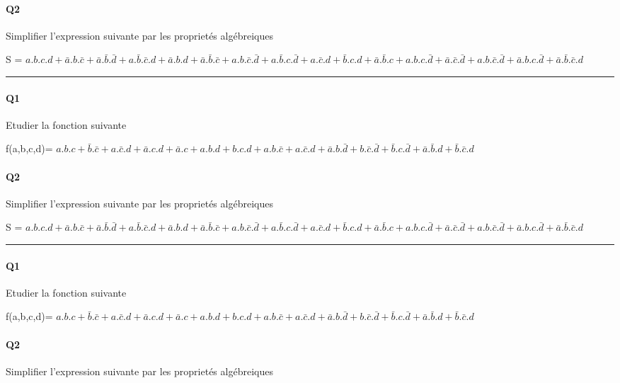 \paragraph{Q2}

Simplifier l'expression suivante par les proprietés algébreiques 

S = $a.b.c.d+\bar a.b.\bar c+\bar a.\bar b.\bar d+a.\bar b.\bar c.d + \bar a.b.d+\bar a.\bar b.\bar c+a.b.\bar c.\bar d+a.\bar b.c.\bar d + a.\bar c.d+\bar b.c.d+\bar a.\bar b.c+a.b.c.\bar d+\bar a.\bar c.\bar d + a.b.\bar c.\bar d+\bar a.b.c.\bar d+\bar a.\bar b.\bar c.d$

\hrule width 1\linewidth
\paragraph{Q1}

Etudier la fonction suivante

f(a,b,c,d)= $a.b.c+\bar b.\bar c+a.\bar c.d+\bar a.c.d + \bar a.c+a.b.d+b.c.d+a.b.\bar c+a.\bar c.d+\bar a.b.\bar d+b.\bar c.\bar d+\bar b.c.\bar d+\bar a.\bar b.d+\bar b.\bar c.d$

\paragraph{Q2}

Simplifier l'expression suivante par les proprietés algébreiques 

S = $a.b.c.d+\bar a.b.\bar c+\bar a.\bar b.\bar d+a.\bar b.\bar c.d + \bar a.b.d+\bar a.\bar b.\bar c+a.b.\bar c.\bar d+a.\bar b.c.\bar d + a.\bar c.d+\bar b.c.d+\bar a.\bar b.c+a.b.c.\bar d+\bar a.\bar c.\bar d + a.b.\bar c.\bar d+\bar a.b.c.\bar d+\bar a.\bar b.\bar c.d$

\hrule width 1\linewidth
\paragraph{Q1}

Etudier la fonction suivante

f(a,b,c,d)= $a.b.c+\bar b.\bar c+a.\bar c.d+\bar a.c.d + \bar a.c+a.b.d+b.c.d+a.b.\bar c+a.\bar c.d+\bar a.b.\bar d+b.\bar c.\bar d+\bar b.c.\bar d+\bar a.\bar b.d+\bar b.\bar c.d$

\paragraph{Q2}

Simplifier l'expression suivante par les proprietés algébreiques 

